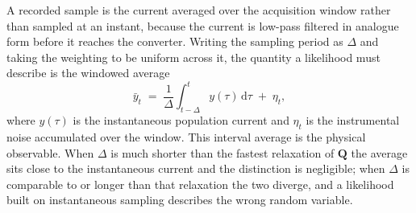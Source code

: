 A recorded sample is the current averaged over the acquisition window rather than sampled at an
instant, because the current is low-pass filtered in analogue form before it reaches the
converter. Writing the sampling period as $\Delta$ and taking the weighting to be uniform across it,
the quantity a likelihood must describe is the windowed average
\begin{equation}
  \bar{y}_t \;=\; \frac{1}{\Delta}\int_{t-\Delta}^{t} y(\tau)\,\mathrm{d}\tau \;+\; \eta_t,
  \label{eq:obs-avg}
\end{equation}
where $y(\tau)$ is the instantaneous population current and $\eta_t$ is the instrumental
noise accumulated over the window. This interval average is the physical observable. When
$\Delta$ is much shorter than the fastest relaxation of $\mathbf{Q}$ the average sits close
to the instantaneous current and the distinction is negligible; when $\Delta$ is comparable
to or longer than that relaxation the two diverge, and a likelihood built on instantaneous
sampling describes the wrong random variable.

